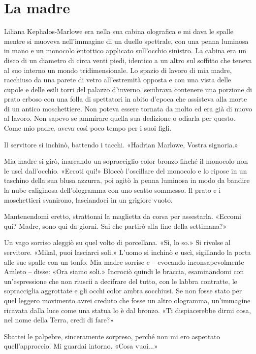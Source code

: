\chapter{La madre}

Liliana Kephalos-Marlowe era nella sua cabina olografica e mi dava le
spalle mentre si muoveva nell'immagine di un duello spettrale, con una
penna luminosa in mano e un monocolo entottico applicato sull'occhio
sinistro. La cabina era un disco di un diametro di circa venti piedi,
identico a un altro sul soffitto che teneva al suo interno un mondo
tridimensionale. Lo spazio di lavoro di mia madre, racchiuso da una
parete di vetro all'estremità opposta e con una vista delle cupole e
delle esili torri del palazzo d'inverno, sembrava contenere una porzione
di prato erboso con una folla di spettatori in abito d'epoca che
assisteva alla morte di un antico moschettiere. Non poteva essere
tornata da molto ed era già di nuovo al lavoro. Non sapevo se ammirare
quella sua dedizione o odiarla per questo. Come mio padre, aveva così
poco tempo per i suoi figli.

Il servitore si inchinò, battendo i tacchi. «Hadrian Marlowe, Vostra
signoria.»

Mia madre si girò, inarcando un sopracciglio color bronzo finché il
monocolo non le uscì dall'occhio. «Eccoti qui!» Bloccò l'oscillare del
monocolo e lo ripose in un taschino della sua blusa azzurra, poi agitò
la penna luminosa in modo da bandire la nube caliginosa dell'ologramma
con uno scatto sommesso. Il prato e i moschettieri svanirono,
lasciandoci in un grigiore vuoto.

Mantenendomi eretto, strattonai la maglietta da corsa per assestarla.
«Eccomi qui? Madre, sono qui da giorni. Sai che partirò alla fine della
settimana?»

Un vago sorriso aleggiò su quel volto di porcellana. «Sì, lo so.» Si
rivolse al servitore. «Mikal, puoi lasciarci soli.» L'uomo si inchinò e
uscì, sigillando la porta alle sue spalle con un tonfo. Mia madre
sorrise e -- evocando inconsapevolmente Amleto -- disse: «Ora siamo
soli.» Incrociò quindi le braccia, esaminandomi con un'espressione che
non riuscii a decifrare del tutto, con le labbra contratte, le
sopracciglia aggrottate e gli occhi color ambra socchiusi. Se non fosse
stato per quel leggero movimento avrei creduto che fosse un altro
ologramma, un'immagine ricavata dalla luce come una statua lo è dal
bronzo. «Ti dispiacerebbe dirmi cosa, nel nome della Terra, credi di
fare?»

Sbattei le palpebre, sinceramente sorpreso, perché non mi ero aspettato
quell'approccio. Mi guardai intorno. «Cosa vuoi...»

